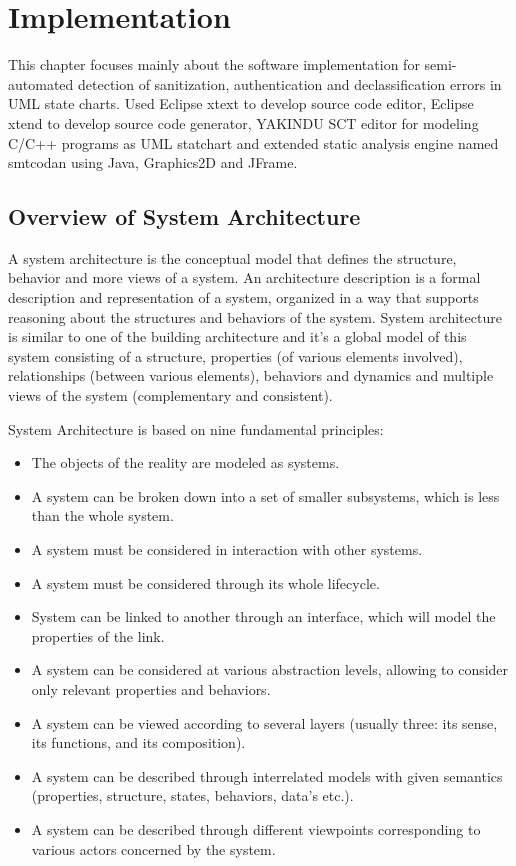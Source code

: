 \chapter{Implementation}
This chapter focuses mainly about the software implementation for semi-automated detection of sanitization, authentication and declassification errors in UML state charts. Used Eclipse xtext to develop source code editor, Eclipse xtend to develop source code generator, YAKINDU SCT editor for modeling C/C++ programs as UML statchart and extended static analysis engine named smtcodan using Java, Graphics2D and JFrame. 

\section{Overview of System Architecture}

A system architecture is the conceptual model that defines the structure, behavior and more views of a system. An architecture description is a formal description and representation of a system, organized in a way that supports reasoning about the structures and behaviors of the system. System architecture is similar to one of the building architecture and it's a global model of this system consisting of a structure, properties (of various elements involved), relationships (between various elements), behaviors and dynamics and multiple views of the system (complementary and consistent).

System Architecture is based on nine fundamental principles:
\begin{itemize}
	\item The objects of the reality are modeled as systems.
	\item A system can be broken down into a set of smaller subsystems, which is less than the whole system.
	\item A system must be considered in interaction with other systems.
	\item A system must be considered through its whole lifecycle.
	\item System can be linked to another through an interface, which will model the properties of the link.
	\item A system can be considered at various abstraction levels, allowing to consider only relevant properties and behaviors.
	\item A system can be viewed according to several layers (usually three: its sense, its functions, and its composition).
	\item A system can be described through interrelated models with given semantics (properties, structure, states, behaviors, data's etc.).
	\item A system can be described through different viewpoints corresponding to various actors concerned by the system.
\end{itemize}

